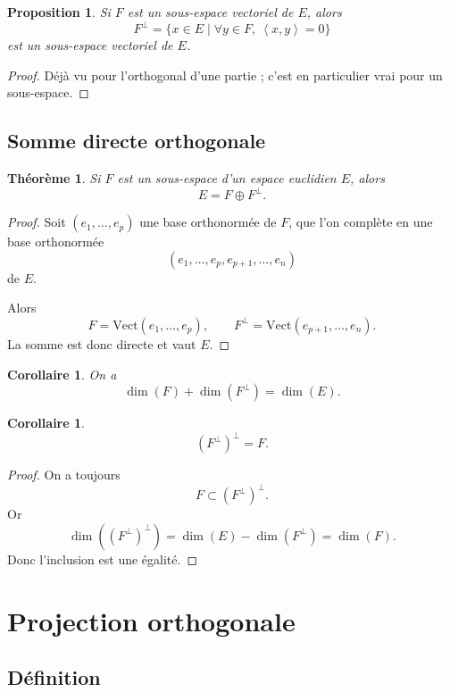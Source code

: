 \documentclass[11pt,a4paper]{article}
\newtheorem{theoreme}[definition]{Théorème}
\newtheorem{proposition}[definition]{Proposition}
\newtheorem{corollaire}[definition]{Corollaire}
\theoremstyle{remark}
\newcommand{\Vect}{\mathrm{Vect}}
\newcommand{\scal}[2]{\left\langle #1,#2\right\rangle}
\newcommand{\Orth}{\perp}
\begin{document}
\begin{proposition}
Si \(F\) est un sous-espace vectoriel de \(E\), alors
\[
F^\Orth=\{x\in E\mid \forall y\in F,\ \scal{x}{y}=0\}
\]
est un sous-espace vectoriel de \(E\).
\end{proposition}

\begin{proof}
Déjà vu pour l’orthogonal d’une partie ; c’est en particulier vrai pour un sous-espace.
\end{proof}

\subsection{Somme directe orthogonale}

\begin{theoreme}
Si \(F\) est un sous-espace d’un espace euclidien \(E\), alors
\[
E=F\oplus F^\Orth.
\]
\end{theoreme}

\begin{proof}
Soit \((e_1,\dots,e_p)\) une base orthonormée de \(F\), que l’on complète en une base orthonormée
\[
(e_1,\dots,e_p,e_{p+1},\dots,e_n)
\]
de \(E\).

Alors
\[
F=\Vect(e_1,\dots,e_p),
\qquad
F^\Orth=\Vect(e_{p+1},\dots,e_n).
\]
La somme est donc directe et vaut \(E\).
\end{proof}

\begin{corollaire}
On a
\[
\dim(F)+\dim(F^\Orth)=\dim(E).
\]
\end{corollaire}

\begin{corollaire}
\[
(F^\Orth)^\Orth=F.
\]
\end{corollaire}

\begin{proof}
On a toujours
\[
F\subset (F^\Orth)^\Orth.
\]
Or
\[
\dim((F^\Orth)^\Orth)=\dim(E)-\dim(F^\Orth)=\dim(F).
\]
Donc l’inclusion est une égalité.
\end{proof}

\section{Projection orthogonale}

\subsection{Définition}
\end{document}
